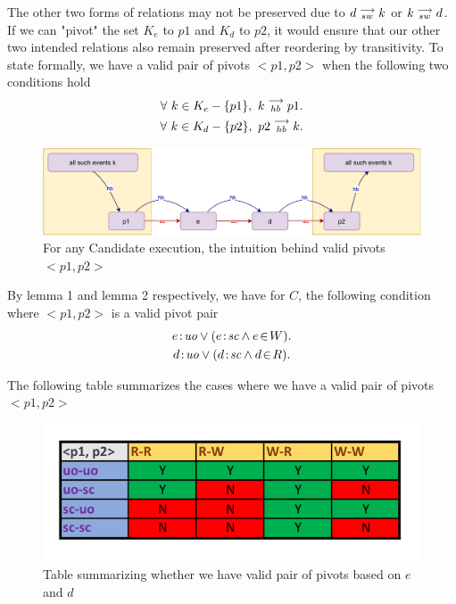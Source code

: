     The other two forms of relations may not be preserved due to $d\stackrel{\longrightarrow}{_{sw}}k$ or $k\stackrel{\longrightarrow}{_{sw}}d$. If we can "pivot" the  set $K_e$ to $p1$ and $K_d$ to $p2$, it would ensure that our other two intended relations also remain preserved after reordering by transitivity. To state formally, we have a valid pair of pivots $<p1,p2>$ when the following two conditions hold
    \begin{gather*}
        \forall \ k \in K_e - \{p1\}, \ k\stackrel{\longrightarrow}{_{hb}}p1. \\
        \forall \ k \in K_d - \{p2\}, \ p2\stackrel{\longrightarrow}{_{hb}}k.
    \end{gather*}
    
    \begin{figure}[H]
        \centering
        \includegraphics[scale=0.7]{Q1(d).pdf}
        \caption{For any Candidate execution, the intuition behind valid pivots $<p1,p2>$}
        \label{fig:my_label}
    \end{figure}
    
    By lemma 1 and lemma 2 respectively, we have for $C$, the following condition where $<p1, p2>$ is a valid pivot pair
    \begin{gather*}
        \et{e}{uo} \vee (\et{e}{sc} \wedge \event{e}{W}). \\
        \et{d}{uo} \vee (\et{d}{sc} \wedge \event{d}{R}).
    \end{gather*}
        
    The following table summarizes the cases where we have a valid pair of pivots $<p1,p2>$
    \begin{figure}[H]
        \centering
        \includegraphics[scale=0.7]{Table1_Final.pdf}
        \caption{Table summarizing whether we have valid pair of pivots based on  $e$ and $d$}
        \label{fig:my_label}
    \end{figure}
            
